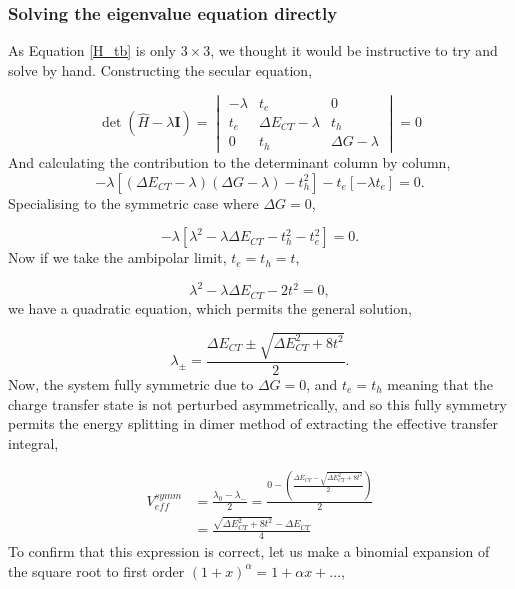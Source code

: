 \documentclass[aps,physrev,reprint,superscriptaddress,nofootinbib,amsmath,amssymb,a4paper]{revtex4-2}
\begin{document}
\subsubsection{Solving the eigenvalue equation directly}

As Equation \ref{H_tb} is only $3 \times 3$, we thought it would be instructive to try and solve by hand. 
Constructing the secular equation, 

\begin{equation}
    \det(\hat{H} - \lambda \mathbf{I}) = 
    \begin{vmatrix} 
        -\lambda & t_e & 0 \\ 
        t_e & \Delta E_{CT} - \lambda & t_h \\ 
        0 & t_h & \Delta G - \lambda 
    \end{vmatrix} = 0
\end{equation}
%
And calculating the contribution to the determinant column by column, 
\begin{equation}
-\lambda \left[ (\Delta E_{CT} - \lambda)(\Delta G - \lambda) - t_h^2 \right] - t_e [-\lambda t_e] = 0 .
\end{equation}
%
Specialising to the symmetric case where $\Delta G = 0$, 

\begin{equation}    
    -\lambda \left[ \lambda^2 - \lambda \Delta E_{CT} - t_h^2 - t_e^2 \right] = 0 .
\end{equation}
%
Now if we take the ambipolar limit, $t_e = t_h = t$, 

\begin{equation}
    \lambda^2 - \lambda \Delta E_{CT} - 2t^2 = 0 , 
\end{equation}
%
we have a quadratic equation, which permits the general solution, 

\begin{equation}
    \lambda_{\pm} = \frac{\Delta E_{CT} \pm \sqrt{\Delta E_{CT}^2 + 8t^2}}{2}. 
\end{equation}
%
Now, the system fully symmetric due to $\Delta G = 0$, and $t_e=t_h$ meaning that the charge transfer state is not perturbed asymmetrically, and so this fully symmetry permits the energy splitting in dimer method of extracting the effective transfer integral, 

\begin{equation}
\begin{aligned}
    V_{eff}^{symm} & = \frac{\lambda_0 - \lambda_-}{2} = \frac{0 - \left( \frac{\Delta E_{CT} - \sqrt{\Delta E_{CT}^2 + 8t^2}}{2} \right)}{2} \\
    & = \frac{\sqrt{\Delta E_{CT}^2 + 8t^2} - \Delta E_{CT}}{4}
\end{aligned}
\end{equation}
%
To confirm that this expression is correct, let us make a binomial expansion of the square root to first order $(1+x)^\alpha = 1 + \alpha x + ...$, 
\end{document}
